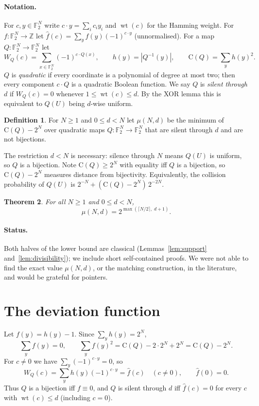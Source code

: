 \documentclass[11pt]{article}
\newtheorem{theorem}{Theorem}
\theoremstyle{definition}
\newtheorem{definition}[theorem]{Definition}
\theoremstyle{remark}
\newcommand{\F}{\mathbb{F}_2}
\newcommand{\wt}{\operatorname{wt}}
\newcommand{\W}{W}
\newcommand{\Coll}{\mathrm{C}}
\begin{document}
\paragraph{Notation.}
For $c,y\in\F^N$ write $c\cdot y=\sum_i c_iy_i$ and $\wt(c)$ for the Hamming
weight. For $f\colon\F^N\to\mathbb{Z}$ let
$\hat f(c)=\sum_{y}f(y)(-1)^{c\cdot y}$ (unnormalised). For a map
$Q\colon\F^N\to\F^N$ let
\[
  \W_Q(c)=\sum_{x\in\F^N}(-1)^{c\cdot Q(x)},\qquad
  h(y)=|Q^{-1}(y)|,\qquad
  \Coll(Q)=\sum_y h(y)^2 .
\]
$Q$ is \emph{quadratic} if every coordinate is a polynomial of degree at most
two; then every component $c\cdot Q$ is a quadratic Boolean function.
We say $Q$ is \emph{silent through $d$} if $\W_Q(c)=0$ whenever
$1\le\wt(c)\le d$. By the XOR lemma this is equivalent to $Q(U)$ being $d$-wise
uniform.

\begin{definition}
For $N\ge1$ and $0\le d<N$ let $\mu(N,d)$ be the minimum of $\Coll(Q)-2^N$ over
quadratic maps $Q\colon\F^N\to\F^N$ that are silent through $d$ and are not
bijections.
\end{definition}

The restriction $d<N$ is necessary: silence through $N$ means $Q(U)$ is uniform,
so $Q$ is a bijection. Note $\Coll(Q)\ge 2^N$ with equality iff $Q$ is a
bijection, so $\Coll(Q)-2^N$ measures distance from bijectivity. Equivalently,
the collision probability of $Q(U)$ is $2^{-N}+(\Coll(Q)-2^N)\,2^{-2N}$.

\begin{theorem}\label{thm:main}
For all $N\ge 1$ and $0\le d<N$,
\[
  \mu(N,d)=2^{\max(\lceil N/2\rceil,\;d+1)} .
\]
\end{theorem}

\paragraph{Status.}
Both halves of the lower bound are classical (Lemmas~\ref{lem:support}
and~\ref{lem:divisibility}); we include short self-contained proofs. We were not
able to find the exact value $\mu(N,d)$, or the matching construction, in the
literature, and would be grateful for pointers.

\section{The deviation function}

Let $f(y)=h(y)-1$. Since $\sum_y h(y)=2^N$,
\begin{equation}\label{eq:excess}
  \sum_y f(y)=0, \qquad
  \sum_y f(y)^2=\Coll(Q)-2\cdot 2^N+2^N=\Coll(Q)-2^N .
\end{equation}
For $c\ne0$ we have $\sum_y(-1)^{c\cdot y}=0$, so
\begin{equation}\label{eq:walsh}
  \W_Q(c)=\sum_y h(y)(-1)^{c\cdot y}=\hat f(c)\quad(c\neq 0),\qquad \hat f(0)=0 .
\end{equation}
Thus $Q$ is a bijection iff $f\equiv 0$, and $Q$ is silent through $d$ iff
$\hat f(c)=0$ for every $c$ with $\wt(c)\le d$ (including $c=0$).
\end{document}
